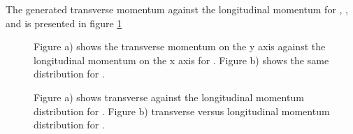 The generated transverse momentum against the longitudinal momentum for \lam, \alam, \anticascade and \excitedcascade is 
presented in figure \ref{fig:MC_lambda0_pt_vs_pz}%


\begin{figure}
	\caption{Figure a) shows the transverse momentum on the y axis against the longitudinal momentum on the x axis for \lam. Figure b) 
			shows the same distribution for \alam.}
	\label{fig:MC_lambda0_pt_vs_pz}
\end{figure}


\begin{figure}
	\caption{Figure a) shows transverse against the longitudinal momentum distribution for \anticascade. Figure b) 
			transverse versus longitudinal momentum distribution for \excitedcascade.}
	\label{fig:MC_xi_pt_vs_pz}
\end{figure}

